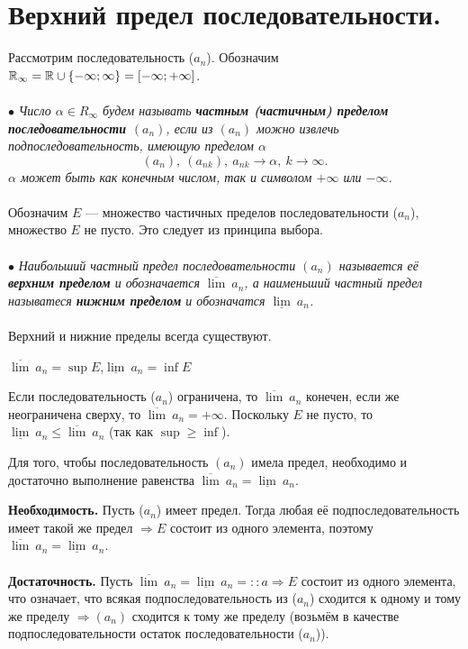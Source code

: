 \section{Верхний предел последовательности.}
Рассмотрим последовательность ($a_n$). Обозначим $\mathbb{R}_\infty = \mathbb{R}\cup\{-\infty ; \infty\}= [-\infty ; +\infty]$.\\\\
$\bullet$ \textit{Число $\alpha \in R_\infty$ будем называть \textbf{частным (частичным) пределом последовательности $(a_n)$}, если из $(a_n)$ можно извлечь подпоследовательность, имеющую пределом $\alpha$ $$ (a_n),\ (a_{nk}),\ a_{nk} \to \alpha,\ k \to \infty.$$ $\alpha$ может быть как конечным числом, так и символом $+\infty$ или $-\infty$.}\\\\
Обозначим $E$ --- множество частичных пределов последовательности ($a_n$), множество $E$ не пусто. Это следует из принципа выбора.\\\\
$\bullet$ \textit{Наибольший частный предел последовательности $(a_n)$ называется её \textbf{верхним пределом} и обозначается $\overline{\lim}\ a_n$, а наименьший частный предел называтеся \textbf{нижним пределом} и обозначатся $\underline{\lim}\ a_n$.}\\\\
Верхний и нижние пределы всегда существуют.
\begin{center}
	$\overline{\lim}\ a_n = \sup E$,\quad $\underline{\lim}\ a_n = \inf E$
\end{center}
Если последовательность ($a_n$) ограничена, то $\overline{\lim}\ a_n$ конечен, если же неограничена сверху, то $\overline{\lim}\ a_n = +\infty$. Поскольку $E$ не пусто, то $\underline{\lim}\ a_n \le \overline{\lim}\ a_n$ (так как $\sup \ge \inf$).
\begin{theorem}
	Для того, чтобы последовательность $(a_n)$ имела предел, необходимо и достаточно выполнение равенства $\overline{\lim}\ a_n = \underline{\lim}\ a_n$.\\
\end{theorem}
\begin{Proof}
	\textbf{Необходимость.} Пусть ($a_n$) имеет предел. Тогда любая её подпоследовательность имеет такой же предел $\Rightarrow E$ состоит из одного элемента, поэтому $\overline{\lim}\ a_n = \underline{\lim}\ a_n$.\\\\
	\textbf{Достаточность.} Пусть $\overline{\lim}\ a_n = \underline{\lim}\ a_n = ::a \Rightarrow E$ состоит из одного элемента, что означает, что всякая подпоследовательность из ($a_n$) сходится к одному и тому же пределу $\Rightarrow (a_n)$ сходится к тому же пределу (возьмём в качестве подпоследовательности остаток последовательности ($a_n$)).
\end{Proof}
